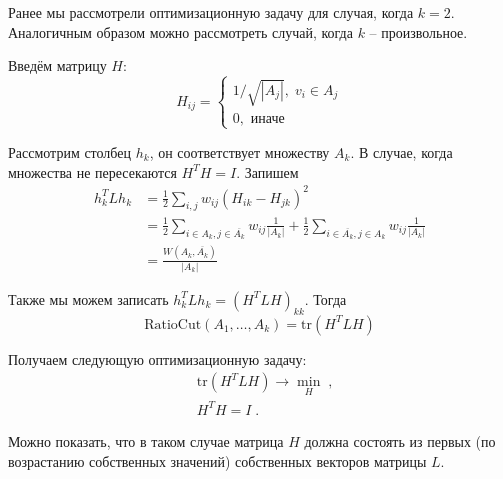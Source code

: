 \documentclass[12pt,a4paper]{article}
\begin{document}
Ранее мы рассмотрели оптимизационную задачу для случая, когда $k=2$. Аналогичным образом можно рассмотреть случай, когда $k$ – произвольное.

Введём матрицу $H$:
\begin{equation*}
	H_{ij} = 
	\begin{cases}
		1/\sqrt{|A_j|}, \; v_i \in A_j \\
		0, \text{ иначе }
	\end{cases}
\end{equation*}

Рассмотрим столбец $h_k$, он соответствует множеству $A_k$. В случае, когда множества не пересекаются $H^TH = I$. Запишем
\begin{align*}
	h_k^T L h_k & = \frac{1}{2} \sum_{i,j}w_{ij}(H_{ik} -H_{jk})^2\\
	& = \frac{1}{2} \sum_{i\in A_k, j\in \overline{A_k}}w_{ij} \frac{1}{|A_k|} 
	+ \frac{1}{2} \sum_{i\in \overline{A_k}, j\in A_k}w_{ij} \frac{1}{|A_k|}  \\
	& = \frac{W(A_k, \overline{A_k})}{|A_k|}
\end{align*}

Также мы можем записать $h_k^T L h_k = (H^T L H)_{kk}$. Тогда
\begin{equation*}
	\text{RatioCut}(A_1, \ldots, A_k) = \text{tr}(H^T L H)
\end{equation*}

Получаем следующую оптимизационную задачу:
\begin{align*}
	& \text{tr}(H^T L H) \rightarrow \min_H \; ,\\
	& H^TH = I \; .
\end{align*}

Можно показать, что в таком случае матрица $H$ должна состоять из первых (по возрастанию собственных значений) собственных векторов матрицы $L$.
\end{document}
